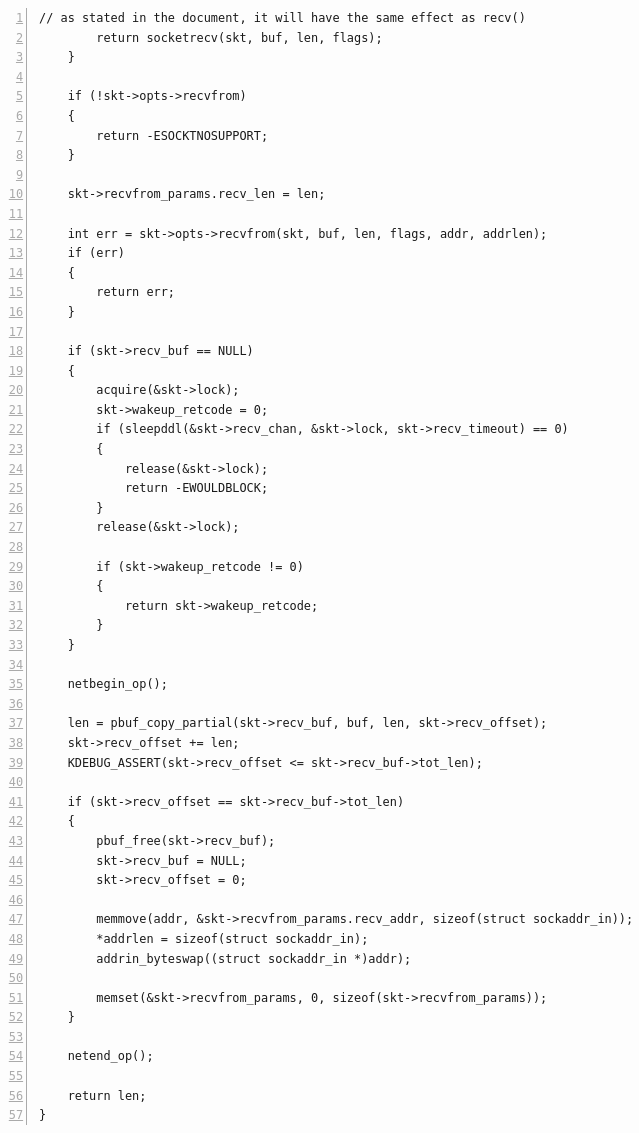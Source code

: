 \documentclass[a4paper,twoside]{ctexrep}
\begin{document}
\begin{spacing}{1.2}
\begin{lstlisting}[numbers=left,style=CppStyle,caption=Socket API的顶层封装,label={code:sockrecvfrom}]
		// as stated in the document, it will have the same effect as recv()
		return socketrecv(skt, buf, len, flags);
	}

	if (!skt->opts->recvfrom)
	{
		return -ESOCKTNOSUPPORT;
	}

	skt->recvfrom_params.recv_len = len;

	int err = skt->opts->recvfrom(skt, buf, len, flags, addr, addrlen);
	if (err)
	{
		return err;
	}

	if (skt->recv_buf == NULL)
	{
		acquire(&skt->lock);
		skt->wakeup_retcode = 0;
		if (sleepddl(&skt->recv_chan, &skt->lock, skt->recv_timeout) == 0)
		{
			release(&skt->lock);
			return -EWOULDBLOCK;
		}
		release(&skt->lock);

		if (skt->wakeup_retcode != 0)
		{
			return skt->wakeup_retcode;
		}
	}

	netbegin_op();

	len = pbuf_copy_partial(skt->recv_buf, buf, len, skt->recv_offset);
	skt->recv_offset += len;
	KDEBUG_ASSERT(skt->recv_offset <= skt->recv_buf->tot_len);

	if (skt->recv_offset == skt->recv_buf->tot_len)
	{
		pbuf_free(skt->recv_buf);
		skt->recv_buf = NULL;
		skt->recv_offset = 0;

		memmove(addr, &skt->recvfrom_params.recv_addr, sizeof(struct sockaddr_in));
		*addrlen = sizeof(struct sockaddr_in);
		addrin_byteswap((struct sockaddr_in *)addr);

		memset(&skt->recvfrom_params, 0, sizeof(skt->recvfrom_params));
	}

	netend_op();

	return len;
}
\end{lstlisting}


\end{spacing}
\end{document}
